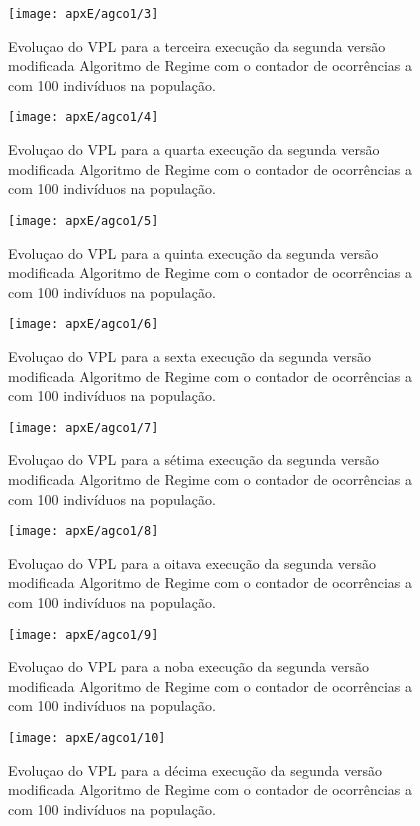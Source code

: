 \begin{figure}[H]
\centering

\texttt{[image: apxE/agco1/3]}
\caption{Evoluçao do VPL para a terceira execução da segunda versão modificada Algoritmo de Regime com o contador de ocorrências a com 100 indivíduos na população.}
\label{fig:graphCO-03}
\end{figure}
\begin{figure}[H]
\centering

\texttt{[image: apxE/agco1/4]}
\caption{Evoluçao do VPL para a quarta execução da segunda versão modificada Algoritmo de Regime com o contador de ocorrências a com 100 indivíduos na população.}
\label{fig:graphCO-04}
\end{figure}
\begin{figure}[H]
\centering

\texttt{[image: apxE/agco1/5]}
\caption{Evoluçao do VPL para a quinta execução da segunda versão modificada Algoritmo de Regime com o contador de ocorrências a com 100 indivíduos na população.}
\label{fig:graphCO-05}
\end{figure}
\begin{figure}[H]
\centering

\texttt{[image: apxE/agco1/6]}
\caption{Evoluçao do VPL para a sexta execução da segunda versão modificada Algoritmo de Regime com o contador de ocorrências a com 100 indivíduos na população.}
\label{fig:graphCO-06}
\end{figure}
\begin{figure}[H]
\centering

\texttt{[image: apxE/agco1/7]}
\caption{Evoluçao do VPL para a sétima execução da segunda versão modificada Algoritmo de Regime com o contador de ocorrências a com 100 indivíduos na população.}
\label{fig:graphCO-07}
\end{figure}
\begin{figure}[H]
\centering

\texttt{[image: apxE/agco1/8]}
\caption{Evoluçao do VPL para a oitava execução da segunda versão modificada Algoritmo de Regime com o contador de ocorrências a com 100 indivíduos na população.}
\label{fig:graphCO-08}
\end{figure}
\begin{figure}[H]
\centering

\texttt{[image: apxE/agco1/9]}
\caption{Evoluçao do VPL para a noba execução da segunda versão modificada Algoritmo de Regime com o contador de ocorrências a com 100 indivíduos na população.}
\label{fig:graphCO-09}
\end{figure}
\begin{figure}[H]
\centering
\texttt{[image: apxE/agco1/10]}
\caption{Evoluçao do VPL para a décima execução da segunda versão modificada Algoritmo de Regime com o contador de ocorrências a com 100 indivíduos na população.}
\label{fig:graphCO-10}
\end{figure}

